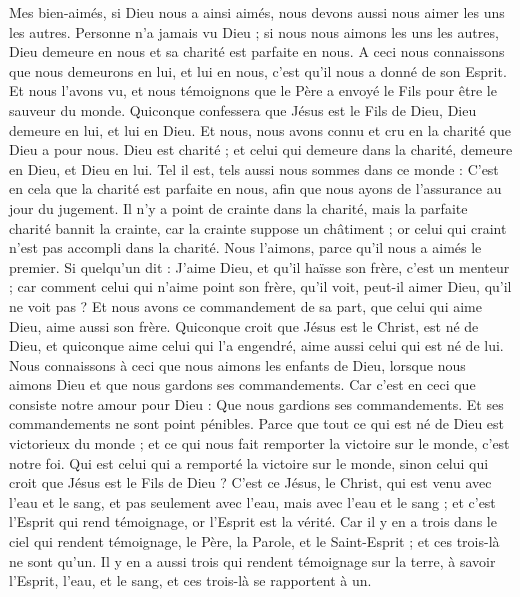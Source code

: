 \begin{multicols}{2}
Mes bien-aimés, si Dieu nous a ainsi aimés, nous devons aussi nous aimer les uns les autres.
Personne n'a jamais vu Dieu ; si nous nous aimons les uns les autres, Dieu demeure en nous et sa charité est parfaite en nous.
A ceci nous connaissons que nous demeurons en lui, et lui en nous, c'est qu'il nous a donné de son Esprit.
Et nous l'avons vu, et nous témoignons que le Père a envoyé le Fils pour être le sauveur du monde.
Quiconque confessera que Jésus est le Fils de Dieu, Dieu demeure en lui, et lui en Dieu.
Et nous, nous avons connu et cru en la charité que Dieu a pour nous. Dieu est charité ; et celui qui demeure dans la charité, demeure en Dieu, et Dieu en lui.
Tel il est, tels aussi nous sommes dans ce monde : C'est en cela que la charité est parfaite en nous, afin que nous ayons de l'assurance au jour du jugement.
Il n'y a point de crainte dans la charité, mais la parfaite charité bannit la crainte, car la crainte suppose un châtiment ; or celui qui craint n'est pas accompli dans la charité.
Nous l'aimons, parce qu'il nous a aimés le premier.
Si quelqu'un dit : J'aime Dieu, et qu'il haïsse son frère, c'est un menteur ; car comment celui qui n'aime point son frère, qu'il voit, peut-il aimer Dieu, qu'il ne voit pas ?
Et nous avons ce commandement de sa part, que celui qui aime Dieu, aime aussi son frère.
\VerseOne{}Quiconque croit que Jésus est le Christ, est né de Dieu, et quiconque aime celui qui l'a engendré, aime aussi celui qui est né de lui.
Nous connaissons à ceci que nous aimons les enfants de Dieu, lorsque nous aimons Dieu et que nous gardons ses commandements.
Car c'est en ceci que consiste notre amour pour Dieu : Que nous gardions ses commandements. Et ses commandements ne sont point pénibles.
Parce que tout ce qui est né de Dieu est victorieux du monde ; et ce qui nous fait remporter la victoire sur le monde, c'est notre foi.
Qui est celui qui a remporté la victoire sur le monde, sinon celui qui croit que Jésus est le Fils de Dieu ?
C'est ce Jésus, le Christ, qui est venu avec l'eau et le sang, et pas seulement avec l'eau, mais avec l'eau et le sang ; et c'est l'Esprit qui rend témoignage, or l'Esprit est la vérité.
Car il y en a trois dans le ciel qui rendent témoignage, le Père, la Parole, et le Saint-Esprit ; et ces trois-là ne sont qu'un.
Il y en a aussi trois qui rendent témoignage sur la terre, à savoir l'Esprit, l'eau, et le sang, et ces trois-là se rapportent à un.

\end{multicols}
